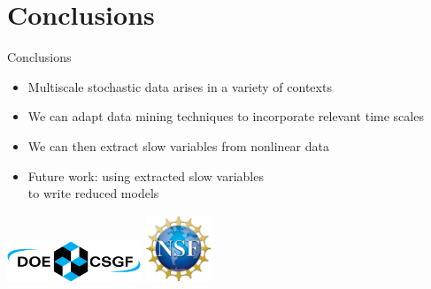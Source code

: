\documentclass[12pt]{beamer}
\begin{document}
\section{Conclusions}

\begin{frame}{Conclusions}

\begin{itemize}
\item Multiscale stochastic data arises in a variety of contexts
\item We can adapt data mining techniques to incorporate relevant time scales
\item We can then extract slow variables from nonlinear data
\item Future work: using extracted slow variables \\to write reduced models

\end{itemize}

\vspace{2cm}
\centering
\includegraphics[width=4cm]{csgf_logo}
\hspace{2cm}
\includegraphics[width=2cm]{nsf_logo}

\end{frame}
\end{document}
